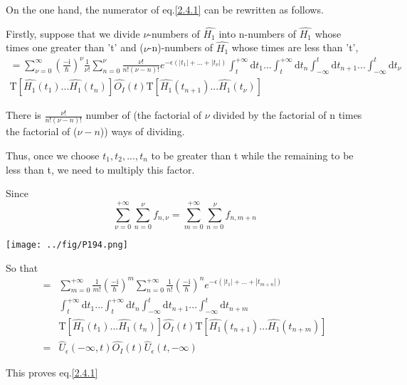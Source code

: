 On the one hand, the numerator of eq.\eqref{2.4.1} can be rewritten as follows.

Firstly, suppose that we divide  $\nu$-numbers of $\hat{H_1}$ into n-numbers of $\hat{H_1}$ whose times one greater than 't' and ($\nu$-n)-numbers of $\hat{H_1}$ whose times are less than 't',
\begin{align}
=\sum_{\nu=0}^{\infty}(\frac{-\mathrm{i}}{\hbar})^{\nu} \frac{1}{\nu!} \sum_{n=0}^{\nu}\frac{\nu!}{n!(\nu-n)!}e^{-\epsilon(|t_1|+...+|t_{\nu}|)} \int_{t}^{+\infty}\mathrm{d}t_1...\int_{t}^{+\infty}\mathrm{d}t_{n} 
\int_{-\infty}^{t}\mathrm{d}t_{n+1}...\int_{-\infty}^{t}\mathrm{d}t_{\nu} \nonumber \\
\mathrm{T}[\hat{H_1}(t_1)...\hat{H_1}(t_{n})]\hat{O_I}(t)\mathrm{T}[\hat{H_1}(t_{n+1})...\hat{H_1}(t_{\nu})] \nonumber
\end{align}

There is $\frac{\nu!}{n!(\nu-n)!}$ number of (the factorial of $\nu$ divided by the factorial of n times the factorial of ($\nu-n$)) ways of dividing.

Thus, once we choose $t_1,t_2,...,t_n$ to be greater than t while the  remaining to be less than t, we need to multiply this factor.

Since 
\begin{equation}
\sum_{\nu=0}^{+\infty}\sum_{n=0}^{\nu} f_{n,\nu}=\sum_{m=0}^{+\infty}\sum_{n=0}^{\nu} f_{n,m+n} \nonumber
\end{equation}
\begin{center}
\texttt{[image: ../fig/P194.png]}
\end{center}
So that
\begin{align}
=&\sum_{m=0}^{+\infty}\frac{1}{m!}(\frac{-\mathrm{i}}{\hbar})^m\sum_{n=0}^{+\infty} \frac{1}{n!}(\frac{-\mathrm{i}}{\hbar})^ne^{-\epsilon(|t_1|+...+|t_{m+n}|)} \nonumber \\
&\int_{t}^{+\infty}\mathrm{d}t_1...\int_{t}^{+\infty}\mathrm{d}t_n\int_{-\infty}^{t}\mathrm{d}t_{n+1}...\int_{-\infty}^{t}\mathrm{d}t_{n+m} \nonumber \\
&\mathrm{T}[\hat{H_1}(t_1)...\hat{H_1}(t_n)]\hat{O_I}(t)\mathrm{T}[\hat{H_1}(t_{n+1})...\hat{H_1}(t_{n+m})] \nonumber \\
=& \hat U_{\epsilon}(-\infty,t)\hat{O_I}(t)\hat U_{\epsilon}(t,-\infty) \nonumber
\end{align}

This proves eq.\eqref{2.4.1}

